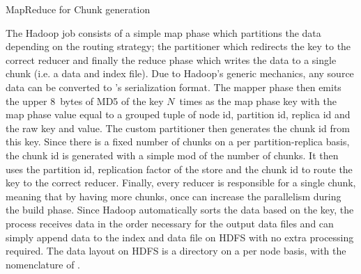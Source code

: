 \begin{algorithm}
\scriptsize
\DontPrintSemicolon
{}


\BlankLine
{}



\BlankLine
{} 

\BlankLine
\caption{MapReduce for Chunk generation}
\label{fig:mapreduce-chunk-generation}
\end{algorithm}

The Hadoop job consists of a simple map phase which partitions the
data depending on the routing strategy; the partitioner which
redirects the key to the correct reducer and finally the reduce phase
which writes the data to a single chunk (i.e. a data and index file).
Due to Hadoop's generic  mechanics, any source data
can be converted to \projectname{}'s serialization format. The mapper
phase then emits the upper 8~bytes of MD5 of the \projectname{} key
$N$~times as the map phase key with the map phase value equal to a
grouped tuple of node id, partition id, replica id and the raw
\projectname{} key and value. The custom partitioner then generates
the chunk id from this key. Since there is a fixed number of chunks on
a per partition-replica basis, the chunk id is generated with a simple
mod of the number of chunks. It then uses the partition id,
replication factor of the store and the chunk id to route the key to
the correct reducer. Finally, every reducer is responsible for a
single chunk, meaning that by having more chunks, once can increase
the parallelism during the build phase. Since Hadoop automatically
sorts the data based on the key, the process receives data in the
order necessary for the output data files and can simply append data
to the index and data file on HDFS with no extra processing required.
The data layout on HDFS is a directory on a per \projectname{} node
basis, with the nomenclature of .

